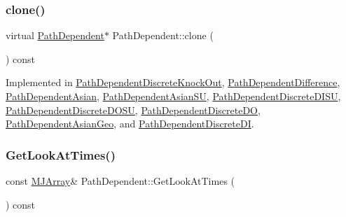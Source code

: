 \hypertarget{classPathDependent_afcc10647f591175642c6dc0adba23f0b}{}\label{classPathDependent_afcc10647f591175642c6dc0adba23f0b} 
\subsubsection{\texorpdfstring{clone()}{clone()}}
{\footnotesize\ttfamily virtual \hyperlink{classPathDependent}{Path\+Dependent}$\ast$ Path\+Dependent\+::clone (\begin{DoxyParamCaption}{ }\end{DoxyParamCaption}) const\hspace{0.3cm}{\ttfamily [pure virtual]}}



Implemented in \hyperlink{classPathDependentDiscreteKnockOut_a5e3b89d4d9eabff48ca28f84c3625151}{Path\+Dependent\+Discrete\+Knock\+Out}, \hyperlink{classPathDependentDifference_a80b73ef2b45a79684153575f3f508dc5}{Path\+Dependent\+Difference}, \hyperlink{classPathDependentAsian_a39a39fccbdf2ea9aad07ad8152b768d5}{Path\+Dependent\+Asian}, \hyperlink{classPathDependentAsianSU_ad564b11ca89eba61b306dccdf824a93a}{Path\+Dependent\+Asian\+SU}, \hyperlink{classPathDependentDiscreteDISU_afb23c79ccf3bb133ea5b56be1dbd61e8}{Path\+Dependent\+Discrete\+D\+I\+SU}, \hyperlink{classPathDependentDiscreteDOSU_a69414d043a94c8fb7f95730c20a086f7}{Path\+Dependent\+Discrete\+D\+O\+SU}, \hyperlink{classPathDependentDiscreteDO_a3de80a8fddb9ef29bf3ed6e97004fc0c}{Path\+Dependent\+Discrete\+DO}, \hyperlink{classPathDependentAsianGeo_a2f180b3c727e6e8e8ed4e39f6a4ee839}{Path\+Dependent\+Asian\+Geo}, and \hyperlink{classPathDependentDiscreteDI_a9b5ac8d8a7562e75a07c31e031586a16}{Path\+Dependent\+Discrete\+DI}.

\hypertarget{classPathDependent_a8d02dbaa57013eab27c857b6f66d64ef}{}\label{classPathDependent_a8d02dbaa57013eab27c857b6f66d64ef} 
\subsubsection{\texorpdfstring{Get\+Look\+At\+Times()}{GetLookAtTimes()}}
{\footnotesize\ttfamily const \hyperlink{classMJArray}{M\+J\+Array}\& Path\+Dependent\+::\+Get\+Look\+At\+Times (\begin{DoxyParamCaption}{ }\end{DoxyParamCaption}) const}

